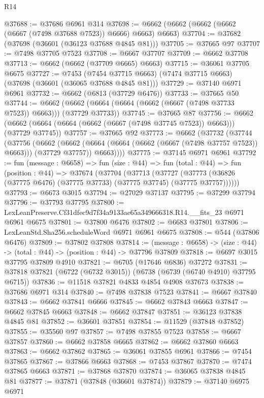 \begin{lexlean}{R14}
\begin{coremodule}
@37688 := @37686 @6961 @314
@37698 := @6662 (@6662 (@6662 (@6662 (@6667 (@7498 @37688 @7523)) @6666) @6663) @6663)
@37704 := @37682 (@37698 (@36601 (@36123 @37688 @4845 @81)))
@37705 := @37665 @97
@37707 := @7498 @37705 @7523
@37708 := @6667 @37707
@37709 := @6662 @37708
@37713 := @6662 (@6662 (@37709 @6665) @6663)
@37715 := @36061 @37705 @6675
@37727 := @7453
    (@7454 @37715 @6663)
    (@7474 @37715 @6663)
    (@37698 (@36601 (@36065 @37688 @4845 @81)))
@37729 := @37140 @6971 @6961
@37732 := @6662 (@6813 (@37729 @6476))
@37733 := @37665 @50
@37744 := @6662 (@6662 (@6664 (@6664 (@6662 (@6667 (@7498 @37733 @7523)) @6663))) (@37729 @37733))
@37745 := @37665 @87
@37756 := @6662 (@6662 (@6664 (@6664 (@6662 (@6667 (@7498 @37745 @7523)) @6663))) (@37729 @37745))
@37757 := @37665 @92
@37773 := @6662
    (@37732
      (@37744
        (@37756
          (@6662
            (@6662 (@6664 (@6664 (@6662 (@6667 (@7498 @37757 @7523)) @6663))) (@37729 @37757))
            @6663))))
@37775 := @37145 @6971 @6961
@37792 := fun (message : @6658) =>
  fun (size : @44) =>
  fun (total : @44) =>
  fun (position : @44) =>
  @37674
    (@37704
      (@37713
        (@37727 (@37773 (@36826 (@37775 @6476) (@37775 @37733) (@37775 @37745) (@37775 @37757))))))
@37793 := @6673 @3015
@37794 := @27029 @37137
@37795 := @37299 @37794
@37796 := @37793 @37795
@37800 := LexLeanPreserve.Cf31dfec9d7f34a9133ae65a349666318.R14.__fits_23 @6971 @6961 @6675
@37801 := @37800 @6476
@37802 := @6683 @37801
@37806 := LexLeanStd.Sha256.scheduleWord @6971 @6961 @6675
@37808 := @544 (@37806 @6476)
@37809 := @37802 @37808
@37814 := (message : @6658) -> (size : @44) -> (total : @44) -> (position : @44) -> @37796 @37809
@37818 := @6697 @3015 @37795 @37809 @4910
@37821 := @6705 (@17646 @6836) @37272
@37831 := @37818 @37821 (@6722 (@6732 @3015)) (@6738 (@6739 (@6740 @4910) @37795 @6715))
@37836 := @11518 @37821 @4833 @4854 @4908 @37673
@37838 := @37686 @6971 @314
@37840 := @7498 @37838 @7523
@37841 := @6667 @37840
@37843 := @6662 @37841 @6666
@37845 := @6662 @37843 @6663
@37847 := @6662 @37845 @6663
@37848 := @6662 @37847
@37851 := @36123 @37838 @4845 @81
@37852 := @36601 @37851
@37854 := @11529 (@37848 @37852)
@37855 := @35560 @97
@37857 := @7498 @37855 @7523
@37858 := @6667 @37857
@37860 := @6662 @37858 @6665
@37862 := @6662 @37860 @6663
@37863 := @6662 @37862
@37865 := @36061 @37855 @6961
@37866 := @7454 @37865
@37867 := @37866 @6663
@37868 := @7453 @37867
@37870 := @7474 @37865 @6663
@37871 := @37868 @37870
@37874 := @36065 @37838 @4845 @81
@37877 := @37871 (@37848 (@36601 @37874))
@37879 := @37140 @6975 @6971

\end{coremodule}
\end{lexlean}
